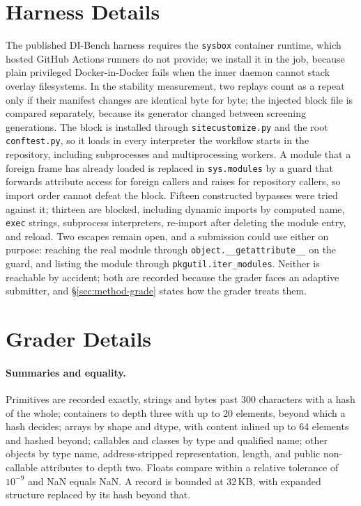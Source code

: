 \documentclass[11pt]{article}
\newcommand{\dibench}{DI-Bench}
\newcommand{\code}[1]{\texttt{\small #1}}
\begin{document}
\section{Harness Details}
\label{app:harness}
The published \dibench{} harness requires the \code{sysbox} container runtime, which hosted GitHub Actions runners do not provide; we install it in the job, because plain privileged Docker-in-Docker fails when the inner daemon cannot stack overlay filesystems.
In the stability measurement, two replays count as a repeat only if their manifest changes are identical byte for byte; the injected block file is compared separately, because its generator changed between screening generations.
The block is installed through \code{sitecustomize.py} and the root \code{conftest.py}, so it loads in every interpreter the workflow starts in the repository, including subprocesses and multiprocessing workers.
A module that a foreign frame has already loaded is replaced in \code{sys.modules} by a guard that forwards attribute access for foreign callers and raises for repository callers, so import order cannot defeat the block.
Fifteen constructed bypasses were tried against it; thirteen are blocked, including dynamic imports by computed name, \code{exec} strings, subprocess interpreters, re-import after deleting the module entry, and reload.
Two escapes remain open, and a submission could use either on purpose: reaching the real module through \code{object.\_\_getattribute\_\_} on the guard, and listing the module through \code{pkgutil.iter\_modules}.
Neither is reachable by accident; both are recorded because the grader faces an adaptive submitter, and \S\ref{sec:method-grade} states how the grader treats them.




\section{Grader Details}
\label{app:grader}
\paragraph{Summaries and equality.}
Primitives are recorded exactly, strings and bytes past 300 characters with a hash of the whole; containers to depth three with up to 20 elements, beyond which a hash decides; arrays by shape and dtype, with content inlined up to 64 elements and hashed beyond; callables and classes by type and qualified name; other objects by type name, address-stripped representation, length, and public non-callable attributes to depth two.
Floats compare within a relative tolerance of $10^{-9}$ and NaN equals NaN.
A record is bounded at 32\,KB, with expanded structure replaced by its hash beyond that.
\end{document}
